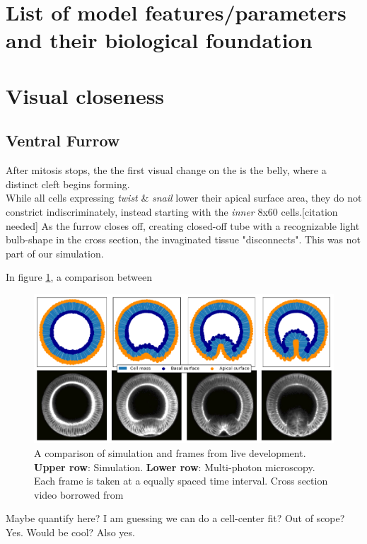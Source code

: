 \section{List of model features/parameters and their biological foundation}
\section{Visual closeness}
\subsection{Ventral Furrow}
After mitosis stops, the the first visual change on the is the belly, where a distinct cleft begins forming. \\

While all cells expressing \textit{twist} \& \textit{snail} lower their apical surface area, they do not constrict indiscriminately, instead starting with the \textit{inner} 8x60 cells.[citation needed] As the furrow closes off, creating closed-off tube with a recognizable light bulb-shape in the cross section, the invaginated tissue "disconnects". This was not part of our simulation.

In figure \ref{fig:VFComparison}, a comparison between

\begin{figure}[H]
    \centering
    \includegraphics[width=1\linewidth]{chapters/Results/figures/VF_comparison.png}
    \caption{A comparison of simulation and frames from live development. \textbf{Upper row}: Simulation. \textbf{Lower row}: Multi-photon microscopy. \\Each frame is taken at a equally spaced time interval. Cross section video borrowed from \cite{conte2012biomechanical}}
    \label{fig:VFComparison}
\end{figure}


Maybe quantify here?
I am guessing we can do a cell-center fit?
Out of scope? Yes. Would be cool? Also yes.
